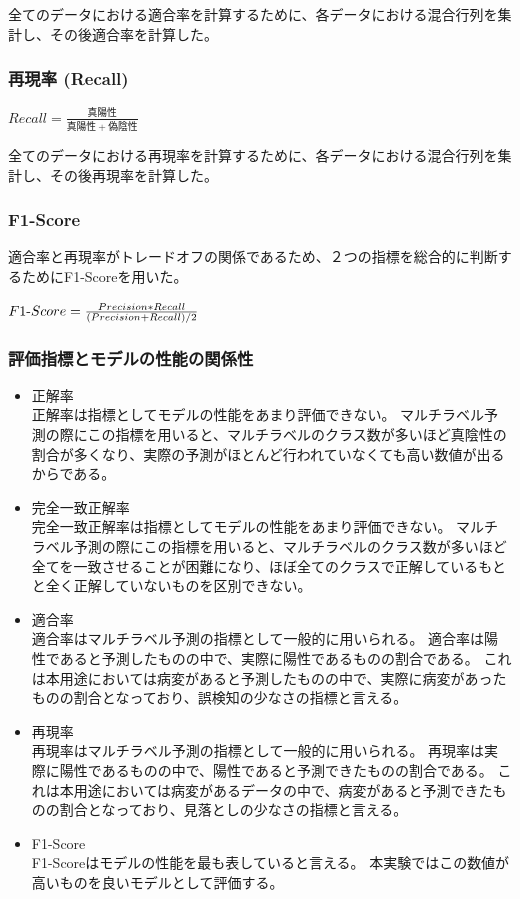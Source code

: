全てのデータにおける適合率を計算するために、各データにおける混合行列を集計し、その後適合率を計算した。
\subsubsection{再現率 (Recall)}
$Recall = \frac{真陽性}{真陽性+偽陰性}$

全てのデータにおける再現率を計算するために、各データにおける混合行列を集計し、その後再現率を計算した。
\subsubsection{F1-Score}
適合率と再現率がトレードオフの関係であるため、２つの指標を総合的に判断するためにF1-Scoreを用いた。

$F1{\rm \mathchar"712D}Score = \frac{Precision * Recall}{(Precision + Recall) / 2}$

\subsubsection{評価指標とモデルの性能の関係性}
\begin{itemize}
    \item 正解率\\
        正解率は指標としてモデルの性能をあまり評価できない。
        マルチラベル予測の際にこの指標を用いると、マルチラベルのクラス数が多いほど真陰性の割合が多くなり、実際の予測がほとんど行われていなくても高い数値が出るからである。
    \item 完全一致正解率\\
        完全一致正解率は指標としてモデルの性能をあまり評価できない。
        マルチラベル予測の際にこの指標を用いると、マルチラベルのクラス数が多いほど全てを一致させることが困難になり、ほぼ全てのクラスで正解しているもとと全く正解していないものを区別できない。
    \item 適合率\\
        適合率はマルチラベル予測の指標として一般的に用いられる。
        適合率は陽性であると予測したものの中で、実際に陽性であるものの割合である。
        これは本用途においては病変があると予測したものの中で、実際に病変があったものの割合となっており、誤検知の少なさの指標と言える。
    \item 再現率\\
        再現率はマルチラベル予測の指標として一般的に用いられる。
        再現率は実際に陽性であるものの中で、陽性であると予測できたものの割合である。
        これは本用途においては病変があるデータの中で、病変があると予測できたものの割合となっており、見落としの少なさの指標と言える。
    \item F1-Score\\
        F1-Scoreはモデルの性能を最も表していると言える。
        本実験ではこの数値が高いものを良いモデルとして評価する。
\end{itemize}


